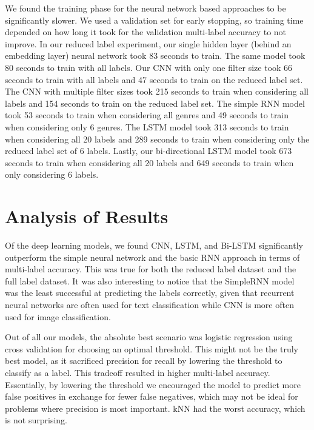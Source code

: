 \documentclass[sigconf]{acmart}
\begin{document}
We found the training phase for the neural network based approaches to be significantly slower. We used a validation set for early stopping, so training time depended on how long it took for the validation multi-label accuracy to not improve. In our reduced label experiment, our single hidden layer (behind an embedding layer) neural network took 83 seconds to train.  The same model took 80 seconds to train with all labels. Our CNN with only one filter size took 66 seconds to train with all labels and 47 seconds to train on the reduced label set. The CNN with multiple filter sizes took 215 seconds to train when considering all labels and 154 seconds to train on the reduced label set. The simple RNN model took 53 seconds to train when considering all genres and 49 seconds to train when considering only 6 genres. The LSTM model took 313 seconds to train when considering all 20 labels and 289 seconds to train when considering only the reduced label set of 6 labels. Lastly, our bi-directional LSTM model took 673 seconds to train when considering all 20 labels and 649 seconds to train when only considering 6 labels. 

\section{Analysis of Results}
Of the deep learning models, we found CNN, LSTM, and Bi-LSTM significantly outperform the simple neural network and the basic RNN approach in terms of multi-label accuracy.  This was true for both the reduced label dataset and the full label dataset. It was also interesting to notice that the SimpleRNN model was the least successful at predicting the labels correctly, given that recurrent neural networks are often used for text classification while CNN is more often used for image classification. 

Out of all our models, the absolute best scenario was logistic regression using cross validation for choosing an optimal threshold.  This might not be the truly best model, as it sacrificed precision for recall by lowering the threshold to classify as a label. This tradeoff resulted in higher multi-label accuracy. Essentially, by lowering the threshold we encouraged the model to predict more false positives in exchange for fewer false negatives, which may not be ideal for problems where precision is most important. kNN had the worst accuracy, which is not surprising.
\end{document}

